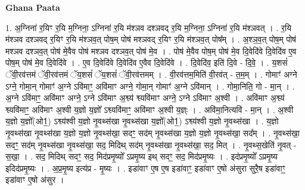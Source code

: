\documentclass[17pt]{extarticle}
\begin{document}
\textbf{Ghana Paata } \newline

1. अ॒ग्निना॑ र॒यिꣳ र॒यि म॒ग्निना॒ ऽग्निना॑ र॒यि म॑श्ञव दश्ञवद् र॒यि म॒ग्निना॒ ऽग्निना॑ र॒यि म॑श्ञवत् । . र॒यि म॑श्ञव दश्ञवद् र॒यिꣳ र॒यि म॑श्ञव॒त् पोष॒म् पोष॑ मश्ञवद् र॒यिꣳ र॒यि म॑श्ञव॒त् पोष᳚म् । . अ॒श्ञ॒व॒त् पोष॒म् पोष॑ मश्ञव दश्ञव॒त् पोष॑ मे॒वैव पोष॑ मश्ञव दश्ञव॒त् पोष॑ मे॒व । . पोष॑ मे॒वैव पोष॒म् पोष॑ मे॒व दि॒वेदि॑वे दि॒वेदि॑व ए॒व पोष॒म् पोष॑ मे॒व दि॒वेदि॑वे । . ए॒व दि॒वेदि॑वे दि॒वेदि॑व ए॒वैव दि॒वेदि॑वे । . दि॒वेदि॑व॒ इति॑ दि॒वे - दि॒वे॒ । . य॒शसं॑ ॅवी॒रव॑त्तमं ॅवी॒रव॑त्तमं ॅय॒शसं॑ ॅय॒शसं॑ ॅवी॒रव॑त्तमम् । . वी॒रव॑त्तम॒मिति॑ वी॒रव॑त् - त॒म॒म् । . गोमाꣳ॑ अग्ने ऽग्ने॒ गोमा॒न् गोमाꣳ॑ अ॒ग्ने ऽवि॑माꣳ॒॒ अवि॑माꣳ अग्ने॒ गोमा॒न् गोमाꣳ॑ अ॒ग्ने ऽवि॑मान् । . गोमा॒निति॒ गो - मा॒न् । . अ॒ग्ने ऽवि॑माꣳ॒॒ अवि॑माꣳ अग्ने॒ ऽग्ने ऽवि॑माꣳ अ॒श्व्य॑ श्व्यवि॑माꣳ अग्ने॒ ऽग्ने ऽवि॑माꣳ अ॒श्वी । . अवि॑माꣳ अ॒श्व्य॑ श्व्यवि॑माꣳ॒॒ अवि॑माꣳ अ॒श्वी य॒ज्ञो य॒ज्ञो᳚ ऽश्व्यवि॑माꣳ॒॒ अवि॑माꣳ अ॒श्वी य॒ज्ञ्ः । . अवि॑मा॒नित्यवि॑ - मा॒न् । . अ॒श्वी य॒ज्ञो य॒ज्ञो᳚(ओ1॒) ऽश्व्य॑श्वी य॒ज्ञो नृ॒वथ्स॑खा नृ॒वथ्स॑खा य॒ज्ञो᳚(ओ1॒) ऽश्व्य॑श्वी य॒ज्ञो नृ॒वथ्स॑खा । . य॒ज्ञो नृ॒वथ्स॑खा नृ॒वथ्स॑खा य॒ज्ञो य॒ज्ञो नृ॒वथ्स॑खा॒ सदꣳ॒॒ सद॑म् नृ॒वथ्स॑खा य॒ज्ञो य॒ज्ञो नृ॒वथ्स॑खा॒ सद᳚म् । . नृ॒वथ्स॑खा॒ सदꣳ॒॒ सद॑म् नृ॒वथ्स॑खा नृ॒वथ्स॑खा॒ सद॒ मिदिथ् सद॑म् नृ॒वथ्स॑खा नृ॒वथ्स॑खा॒ सद॒ मित् । . नृ॒वथ्स॒खेति॑ नृ॒वत् - स॒खा॒ । . सद॒ मिदिथ् सदꣳ॒॒ सद॒ मिद॑प्रमृ॒ष्यो᳚ ऽप्रमृ॒ष्य इथ् सदꣳ॒॒ सद॒ मिद॑प्रमृ॒ष्यः । . इद॑प्रमृ॒ष्यो᳚ ऽप्रमृ॒ष्य इदिद॑प्रमृ॒ष्यः । . अ॒प्र॒मृ॒ष्य इत्य॑प्र - मृ॒ष्यः । . इडा॑वाꣳ ए॒ष ए॒ष इडा॑वाꣳ॒॒ इडा॑वाꣳ ए॒षो अ॑सुरा सुरै॒ष इडा॑वाꣳ॒॒ इडा॑वाꣳ ए॒षो अ॑सुर । \newline
\end{document}

